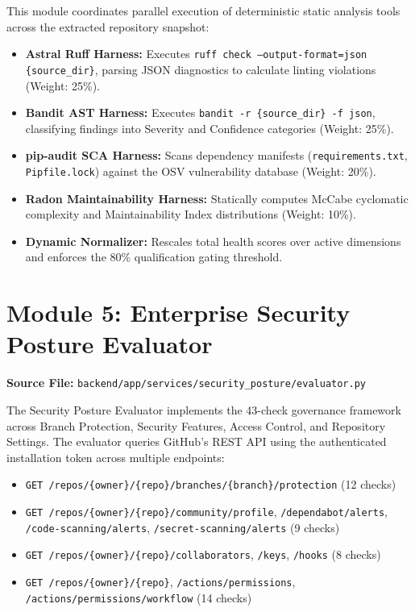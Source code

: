 \documentclass[12pt,a4paper,oneside]{report}
\begin{document}
This module coordinates parallel execution of deterministic static analysis tools across the extracted repository snapshot:
\begin{itemize}
    \item \textbf{Astral Ruff Harness:} Executes \texttt{ruff check --output-format=json \{source\_dir\}}, parsing JSON diagnostics to calculate linting violations (Weight: 25\%).
    \item \textbf{Bandit AST Harness:} Executes \texttt{bandit -r \{source\_dir\} -f json}, classifying findings into Severity and Confidence categories (Weight: 25\%).
    \item \textbf{pip-audit SCA Harness:} Scans dependency manifests (\texttt{requirements.txt}, \texttt{Pipfile.lock}) against the OSV vulnerability database (Weight: 20\%).
    \item \textbf{Radon Maintainability Harness:} Statically computes McCabe cyclomatic complexity and Maintainability Index distributions (Weight: 10\%).
    \item \textbf{Dynamic Normalizer:} Rescales total health scores over active dimensions and enforces the 80\% qualification gating threshold.
\end{itemize}

\section{Module 5: Enterprise Security Posture Evaluator}
\label{sec:impl-posture-eval}

\noindent\textbf{Source File:} \texttt{backend/app/services/security\_posture/evaluator.py}

The Security Posture Evaluator implements the 43-check governance framework across Branch Protection, Security Features, Access Control, and Repository Settings. The evaluator queries GitHub's REST API using the authenticated installation token across multiple endpoints:
\begin{itemize}
    \item \texttt{GET /repos/\{owner\}/\{repo\}/branches/\{branch\}/protection} (12 checks)
    \item \texttt{GET /repos/\{owner\}/\{repo\}/community/profile}, \texttt{/dependabot/alerts}, \texttt{/code-scanning/alerts}, \texttt{/secret-scanning/alerts} (9 checks)
    \item \texttt{GET /repos/\{owner\}/\{repo\}/collaborators}, \texttt{/keys}, \texttt{/hooks} (8 checks)
    \item \texttt{GET /repos/\{owner\}/\{repo\}}, \texttt{/actions/permissions}, \texttt{/actions/permissions/workflow} (14 checks)
\end{itemize}
\end{document}
